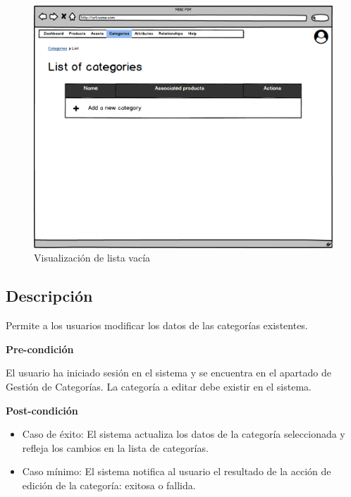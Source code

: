 \begin{figure}[H]
    \includegraphics[width=1\linewidth]{mockups/RF4.2_2.png}
    \caption{Visualización de lista vacía}
   \end{figure}
\vspace{1.0cm}

\newpage %


\subsection*{Descripción}
Permite a los usuarios modificar los datos de las categorías existentes.\par
\vspace{0.15cm}

\textbf{Pre-condición}\par
El usuario ha iniciado sesión en el sistema y se encuentra en el apartado de Gestión de Categorías. La categoría a editar debe existir en el sistema.\par
\vspace{0.15cm}

\textbf{Post-condición}
\begin{itemize}
    \item Caso de éxito: El sistema actualiza los datos de la categoría seleccionada y refleja los cambios en la lista de categorías.
    \item Caso mínimo: El sistema notifica al usuario el resultado de la acción de edición de la categoría: exitosa o fallida.
\end{itemize}

